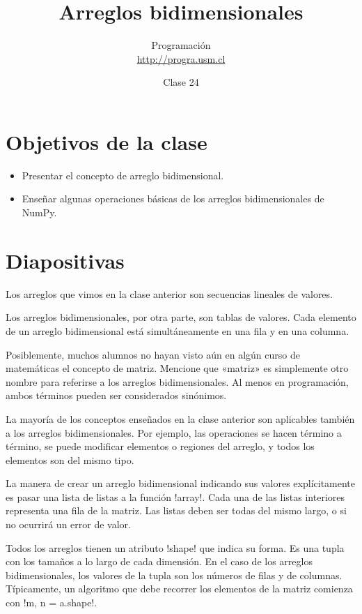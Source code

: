 \documentclass[10pt]{article}
\title{Arreglos bidimensionales}
\author{Programación \\ \url{http://progra.usm.cl}}
\date{Clase 24}
\begin{document}
  \maketitle

  \section*{Objetivos de la clase}
  \begin{itemize}
    \item Presentar el concepto
      de arreglo bidimensional.
    \item Enseñar algunas operaciones básicas
      de los arreglos bidimensionales de NumPy.
  \end{itemize}

  \section*{Diapositivas}

  Los arreglos que vimos en la clase anterior
  son secuencias lineales de valores.

  Los arreglos bidimensionales, por otra parte,
  son tablas de valores.
  Cada elemento de un arreglo bidimensional
  está simultáneamente en una fila y en una columna.

  Posiblemente,
  muchos alumnos no hayan visto aún en algún curso de matemáticas
  el concepto de matriz.
  Mencione que «matriz» es simplemente otro nombre
  para referirse a los arreglos bidimensionales.
  Al menos en programación,
  ambos términos pueden ser considerados sinónimos.

  La mayoría de los conceptos enseñados en la clase anterior
  son aplicables también a los arreglos bidimensionales.
  Por ejemplo, las operaciones se hacen término a término,
  se puede modificar elementos o regiones del arreglo, y
  todos los elementos son del mismo tipo.


  La manera de crear un arreglo bidimensional
  indicando sus valores explícitamente
  es pasar una lista de listas
  a la función \li!array!.
  Cada una de las listas interiores
  representa una fila de la matriz.
  Las listas deben ser todas del mismo largo,
  o si no ocurrirá un error de valor.

  Todos los arreglos tienen un atributo \li!shape!
  que indica su forma.
  Es una tupla con los tamaños a lo largo de cada dimensión.
  En el caso de los arreglos bidimensionales,
  los valores de la tupla son los números de filas y de columnas.
  Típicamente,
  un algoritmo que debe recorrer los elementos de la matriz
  comienza con \li!m, n = a.shape!.
\end{document}
